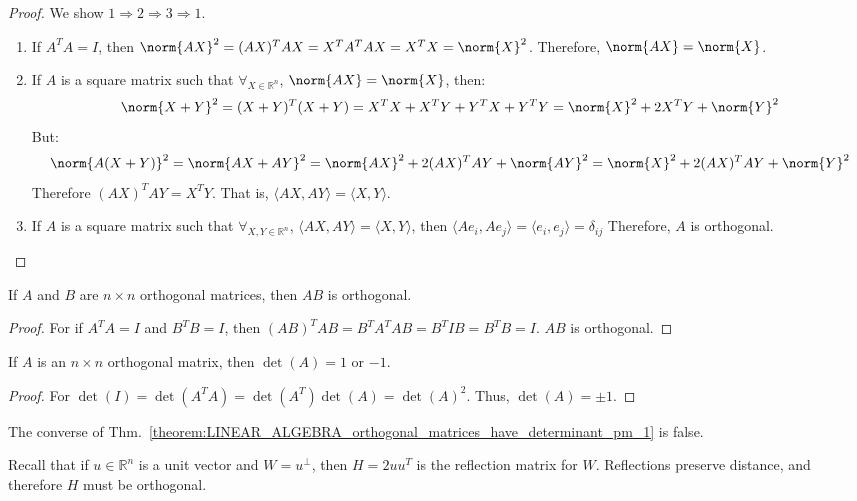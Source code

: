 \documentclass[crop=false,class=book]{standalone}
\begin{document}
\begin{proof}
We show $1\Rightarrow 2 \Rightarrow 3 \Rightarrow 1$.
\begin{enumerate}
    \item If $A^TA = I$, then $\norm{AX}^{2}=(AX)^{T}AX=X^{T}A^{T}AX=X^{T}X=\norm{X}^{2}$. Therefore, $\norm{AX}=\norm{X}$.
    \item If $A$ is a square matrix such that $\forall_{X\in\mathbb{R}^{n}}$, $\norm{AX} = \norm{X}$, then:
    \begin{equation*}
        \norm{X+Y}^{2}=(X+Y)^T(X+Y)=X^TX+X^TY+Y^TX+Y^TY=\norm{X}^2+2X^TY+\norm{Y}^2
    \end{equation*}
    But:
    \begin{equation*}
        \norm{A(X+Y)}^{2}=\norm{AX+AY}^{2}=\norm{AX}^{2}+2(AX)^{T}AY+\norm{AY}^2=\norm{X}^{2}+2(AX)^{T}AY+\norm{Y}^2
    \end{equation*}
    Therefore $(AX)^TAY = X^TY$. That is, $\langle AX, AY\rangle = \langle X, Y\rangle$.
    \item If $A$ is a square matrix such that $\forall_{X,Y\in \mathbb{R}^n}$, $\langle AX, AY\rangle = \langle X, Y\rangle$, then $\langle Ae_{i}, Ae_{j}\rangle=\langle e_i,e_j\rangle=\delta_{ij}$
    Therefore, $A$ is orthogonal.
\end{enumerate}
\end{proof}
\begin{theorem}
If $A$ and $B$ are $n\times n$ orthogonal matrices, then $AB$ is orthogonal.
\end{theorem}
\begin{proof}
For if $A^{T}A = I$ and $B^{T}B = I$, then $(AB)^{T}AB = B^{T}A^{T}AB = B^{T}IB = B^{T}B = I$. $AB$ is orthogonal.
\end{proof}
\begin{theorem}
\label{theorem:LINEAR_ALGEBRA_orthogonal_matrices_have_determinant_pm_1}
If $A$ is an $n\times n$ orthogonal matrix, then $\det(A) = 1$ or $-1$.
\end{theorem}
\begin{proof}
For $\det(I) = \det(A^TA) = \det(A^T)\det(A) = \det(A)^2$. Thus, $\det(A) = \pm 1$.
\end{proof}
\begin{remark}
The converse of Thm.~\ref{theorem:LINEAR_ALGEBRA_orthogonal_matrices_have_determinant_pm_1} is false.
\end{remark}
Recall that if $u\in \mathbb{R}^n$ is a unit vector and $W = u^{\perp}$, then $H=2uu^T$ is the reflection matrix for $W$. Reflections preserve distance, and therefore $H$ must be orthogonal.
\end{document}
